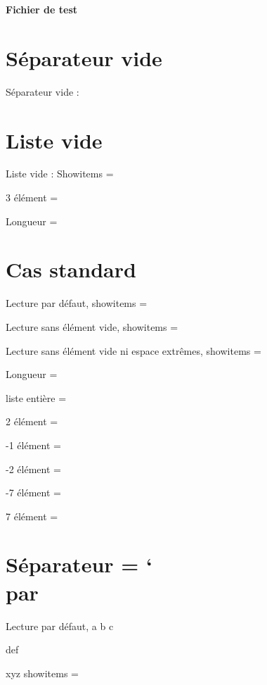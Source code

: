 \documentclass[french]{article}
\begin{document}
\parindent=0pt
{\hfill\huge\bfseries Fichier de test\hfill\null\par}
\section{Séparateur vide}
Séparateur vide :\setsepchar{}%
\readlist{}
\showitems\castordu

\section{Liste vide}
Liste vide :\setsepchar{*}
\readlist\listevide{}%
Showitems = \showitems\listevide\par%
3\ieme{} élément = \listevide[3]\par%
Longueur = \listevidelen%

\section{Cas standard}
\setsepchar{+}
Lecture par défaut,\readlist{}
showitems = \showitems*\maliste

Lecture sans élément vide,\ignoreemptyitems
\readlist{}
showitems = \showitems*\maliste

Lecture sans élément vide ni espace extrêmes,\ignoreemptyitems
\readlist*{}
showitems = \showitems*\maliste

Longueur = \malistelen\par
liste entière = \maliste[]\par
2\ieme{} élément = \maliste[2]\par
-1\ieme{} élément = \maliste[-1]\par
-2\ieme{} élément = \maliste[-2]\par
-7\ieme{} élément = \maliste[-7]\par%
7\ieme{} élément = \maliste[7]%

\section{Séparateur = \char`\\par}
\def\laliste{a b c \par def\par\par xyz}
\reademptyitems
\setsepchar{\par}
Lecture par défaut, \readlist\maliste\laliste
showitems = \showitems\maliste
\end{document}
